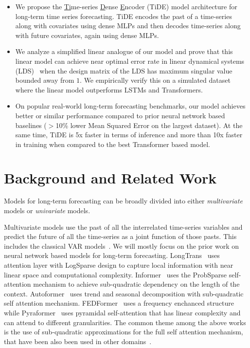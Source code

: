 \documentclass[10pt]{article} \usepackage[accepted]{tmlr}
\theoremstyle{plain}
\theoremstyle{definition}
\theoremstyle{remark}
\begin{document}
\begin{itemize}
\item We propose the \underline{Ti}me-series \underline{D}ense \underline{E}ncoder (TiDE) model architecture for long-term time series forecasting.  TiDE encodes the past of a time-series along with covariates using dense MLPs and then decodes  time-series along with future covariates, again using dense MLPs.  

\item We analyze a simplified linear analogue of our model and prove that this linear model can achieve near optimal error rate in linear dynamical systems (LDS)~\citep{kalman1963mathematical} when the design matrix of the LDS has maximum singular value bounded away from $1$. We empirically verify this on a simulated dataset where the linear model outperforms LSTMs and Transformers.  

\item On popular real-world long-term forecasting benchmarks, our model achieves better or similar performance compared to prior neural network based baselines ($>$10\% lower Mean Squared Error on the largest dataset). At the same time, TiDE is 5x faster in terms of inference and more than 10x faster in training when compared to the best Transformer based model.
\end{itemize}







\section{Background and Related Work}
\label{sec:rwork}
Models for long-term forecasting can be broadly divided into either \textit{multivariate} models or \textit{univariate} models.

Multivariate models use the past of all the interrelated time-series variables and predict the future of all the time-series as a joint function of those pasts. This includes the classical VAR models~\citep{zivot2006vector}. We will mostly focus on the prior work on neural network based models for long-term forecasting. LongTrans~\citep{li2019enhancing} uses attention layer with LogSparse design to capture local information with near linear space and computational complexity. Informer~\citep{zhou2021informer} uses the ProbSparse self-attention mechanism to achieve sub-quadratic dependency on the length of the context. Autoformer~\citep{wu2021autoformer} uses trend and seasonal decomposition with sub-quadratic self attention mechanism. FEDFormer~\citep{zhou2022fedformer} uses a frequency enchanced structure while Pyraformer~\citep{liu2021pyraformer} uses pyramidal self-attention that has linear complexity and can attend to different granularities. The common theme among the above works is the use of sub-quadratic approximations for the full self attention mechanism, that have been also been used in other domains~\citep{wang2020linformer}.
\end{document}
